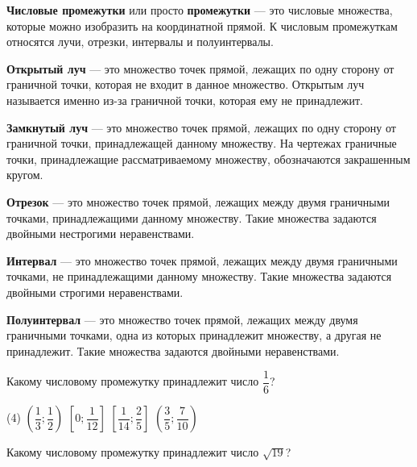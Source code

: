 \begin{class}[number=5]
	\begin{definit}
	\textbf{Числовые промежутки} или просто \textbf{промежутки} --- это числовые множества, которые можно изобразить на координатной прямой. К числовым промежуткам относятся лучи, отрезки, интервалы и полуинтервалы.
	\end{definit}
	\begin{definit}
	\textbf{Открытый луч} --- это множество точек прямой, лежащих по одну сторону от граничной точки, которая не входит в данное множество. Открытым луч называется именно из-за граничной точки, которая ему не принадлежит.
	\end{definit}
	\begin{definit}
	\textbf{Замкнутый луч} --- это множество точек прямой, лежащих по одну сторону от граничной точки, принадлежащей данному множеству. На чертежах граничные точки, принадлежащие рассматриваемому множеству, обозначаются закрашенным кругом.
	\end{definit}
	\begin{definit}
	\textbf{Отрезок} — это множество точек прямой, лежащих между двумя граничными точками, принадлежащими данному множеству. Такие множества задаются двойными нестрогими неравенствами.
	\end{definit}
	\begin{definit}
	\textbf{Интервал} --- это множество точек прямой, лежащих между двумя граничными точками, не принадлежащими данному множеству. Такие множества задаются двойными строгими неравенствами.	
	\end{definit}
	\begin{definit}
	\textbf{Полуинтервал} --- это множество точек прямой, лежащих между двумя граничными точками, одна из которых принадлежит множеству, а другая не принадлежит. Такие множества задаются двойными неравенствами.
	\end{definit}	
	\begin{listofex}
		\item Какому числовому промежутку принадлежит число \( \dfrac{1}{6} \)?
		\begin{tasks}(4)
			\task \( \left( \dfrac{1}{3};\dfrac{1}{2}\right)  \)
			\task \( \left[ 0;\dfrac{1}{12}\right]  \)
			\task \( \left[ \dfrac{1}{14};\dfrac{2}{5}\right]  \)
			\task \( \left( \dfrac{3}{5};\dfrac{7}{10}\right)  \)
		\end{tasks}
		\item Какому числовому промежутку принадлежит число \( \sqrt{19} \)?

\end{listofex}
\end{class}

